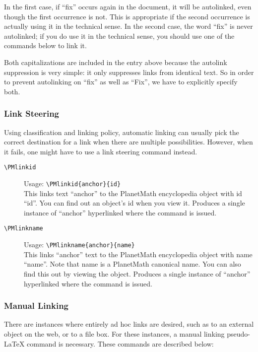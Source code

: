In the first case, if ``fix'' occurs again in the document, it will be autolinked, even though the first occurrence is not. This is appropriate if the second occurrence is actually using it in the technical sense. In the second case, the word ``fix'' is never autolinked; if you do use it in the technical sense, you should use one of the commands below to link it.

Both capitalizations are included in the entry above because the autolink suppression is very simple: it only suppresses links from identical text. So in order to prevent autolinking on ``fix'' as well as ``Fix'', we have to explicitly specify both.

\subsubsection*{Link Steering}

Using classification and linking policy, automatic linking can usually pick the correct destination for a link when there are multiple possibilities. However, when it fails, one might have to use a link steering command instead.

\begin{description}
\item[\texttt{\textbackslash{}PMlinkid}]
 Usage: \texttt{\textbackslash{}PMlinkid\{anchor\}\{id\}}\\
This links text ``anchor'' to the PlanetMath encyclopedia object with id ``id''. You can find out an object's id when you view it. Produces a single instance of ``anchor'' hyperlinked where the command is issued.
\item[\texttt{\textbackslash{}PMlinkname}]
 Usage: \texttt{\textbackslash{}PMlinkname\{anchor\}\{name\}}\\
 This links ``anchor'' text to the PlanetMath encyclopedia object with name ``name''. Note that name is a PlanetMath canonical name. You can also find this out by viewing the object. Produces a single instance of ``anchor'' hyperlinked where the command is issued.
\end{description}

\subsubsection*{Manual Linking}

There are instances where entirely ad hoc links are desired, such as to an external object on the web, or to a file box. For these instances, a manual linking pseudo-\LaTeX{} command is necessary. These commands are described below:

